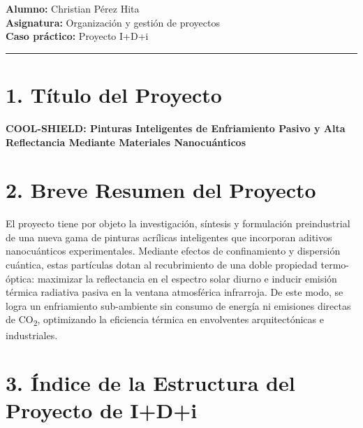 \documentclass[11pt,a4paper]{article}
\begin{document}
\begin{flushleft}
    \textbf{Alumno:} Christian Pérez Hita \\
    \textbf{Asignatura:} Organización y gestión de proyectos \\
    \textbf{Caso práctico:} Proyecto I+D+i
\end{flushleft}

\vspace{0.8em}
\hrule
\vspace{1.5em}

\section*{1. Título del Proyecto}
\noindent\textbf{COOL-SHIELD: Pinturas Inteligentes de Enfriamiento Pasivo y Alta Reflectancia Mediante Materiales Nanocuánticos}

\vspace{1.2em}
\section*{2. Breve Resumen del Proyecto}
El proyecto tiene por objeto la investigación, síntesis y formulación preindustrial de una nueva gama de pinturas acrílicas inteligentes que incorporan aditivos nanocuánticos experimentales. Mediante efectos de confinamiento y dispersión cuántica, estas partículas dotan al recubrimiento de una doble propiedad termo-óptica: maximizar la reflectancia en el espectro solar diurno e inducir emisión térmica radiativa pasiva en la ventana atmosférica infrarroja. De este modo, se logra un enfriamiento sub-ambiente sin consumo de energía ni emisiones directas de CO\textsubscript{2}, optimizando la eficiencia térmica en envolventes arquitectónicas e industriales.

\vspace{1.2em}
\section*{3. Índice de la Estructura del Proyecto de I+D+i}
\end{document}
